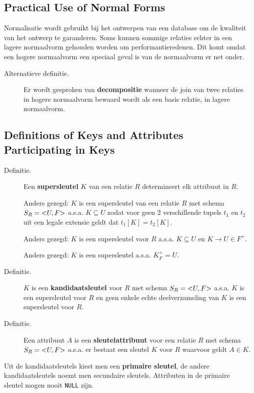 \subsection{Practical Use of Normal Forms}
Normalisatie wordt gebruikt bij het ontwerpen van een database om de kwaliteit van het ontwerp te garanderen. Soms kunnen sommige relaties echter in een lagere normaalvorm gehouden worden om performantieredenen. Dit komt omdat een hogere normaalvorm een speciaal geval is van de normaalvorm er net onder.
\begin{description}
	\item[Alternatieve definitie. ] Er wordt gesproken van \textbf{decompositie} wanneer de join van twee relaties in hogere normaalvorm bewaard wordt als een basis relatie, in lagere normaalvorm.
\end{description}


\subsection{Definitions of Keys and Attributes Participating in Keys}
\begin{description}
	\item[Definitie.] Een \textbf{supersleutel} $K$ van een relatie $R$ determineert elk attribuut in $R$.

	Anders gezegd: $K$ is een supersleutel van een relatie $R$ met schema $S_R = \text{\textless} U,F \text{\textgreater}$ a.s.a. $K \subseteq U$ zodat voor geen 2 verschillende tupels $t_1$ en $t_2$ uit een legale extensie geldt dat $t_1[K] = t_2[K]$.

	Anders gezegd: $K$ is een supersleutel voor $R$ a.s.a. $K \subseteq U$ en $K \rightarrow U \in F^+$.

	Anders gezegd: $K$ is een supersleutel a.s.a. $K_F^+ = U$.

	\item[Definitie.] $K$ is een \textbf{kandidaatsleutel} voor $R$ met schema $S_R = \text{\textless} U,F \text{\textgreater}$ a.s.a. $K$ is een supersleutel voor $R$ en geen enkele echte deelverzameling van $K$ is een supersleutel voor $R$.

	\item[Definitie.] Een attribuut $A$ is een \textbf{sleutelattribuut} voor een relatie $R$ met schema $S_R = \text{\textless} U,F \text{\textgreater}$ a.s.a. er bestaat een sleutel $K$ voor $R$ waarvoor geldt $A \in K$.
\end{description}
Uit de kandidaatsleutels kiest men een \textbf{primaire sleutel}, de andere kandidaatsleutels noemt men secundaire sleutels. Attributen in de primaire sleutel mogen nooit \texttt{NULL} zijn.

